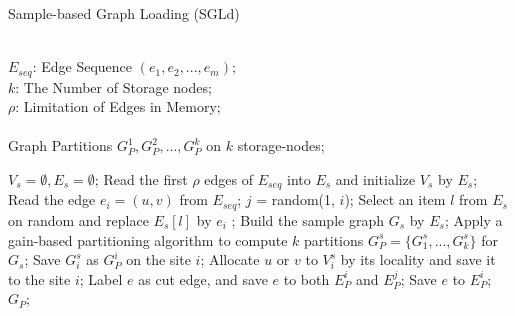 \documentclass{sig-alternate-2013}
\begin{document}
\begin{algorithm}[h]
\renewcommand{\algorithmicrequire}{\textbf{Input:}}
\renewcommand\algorithmicensure {\textbf{Output:} }
\caption{Sample-based Graph Loading (SGLd)}
\label{alg:sampling-graph}
\begin{algorithmic}[1]
\REQUIRE ~~\\
$E_{seq}$: Edge Sequence $(e_1,e_2,...,e_m)$;\\
$k$: The Number of Storage nodes;\\
$\rho$: Limitation of Edges in Memory;\\
\ENSURE ~~\\
Graph Partitions $G_P^1,G_P^2,...,G_P^k$ on $k$ storage-nodes;

\STATE $V_s=\emptyset,E_s=\emptyset$;
\STATE Read the first $\rho$ edges of $E_{seq}$ into $E_s$ and initialize $V_s$ by $E_s$; \label{alogrithm-sgl-disk-sample-step-begin}
 \STATE Read the edge $e_i=(u,v)$ from $E_{seq}$;
 \STATE $j$ = random(1, $i$);
   \STATE Select an item $l$ from $E_s$ on random and replace $E_s[l]$ by $e_i$ ;
 \ENDIF
\ENDFOR \label{alogrithm-sgl-disk-sample-step-end}
\STATE Build the sample graph  $G_s$ by $E_s$;
\STATE Apply a gain-based partitioning algorithm  to compute $k$ partitions $G_P^s=\{G_1^s,...,G_k^s\}$ for $G_s$;
  \STATE Save $G_i^s$ as $G_P^i$ on the site $i$;
\ENDFOR
{} \label{alogrithm-sgl-disk-allocate-step-begin}
    \STATE Allocate  $u$ or $v$ to $V_i^s$ by its locality and save it to the site $i$;
  \ENDIF %
   \STATE Label $e$ as cut edge, and save $e$ to both $E_P^i$ and $E_P^j$;
  \ELSE
    \STATE Save $e$ to $E_P^i$;
  \ENDIF %
 \ENDFOR \label{alogrithm-sgl-disk-allocate-step-end}
\RETURN $G_P$;
\end{algorithmic}
\end{algorithm}
\end{document}
